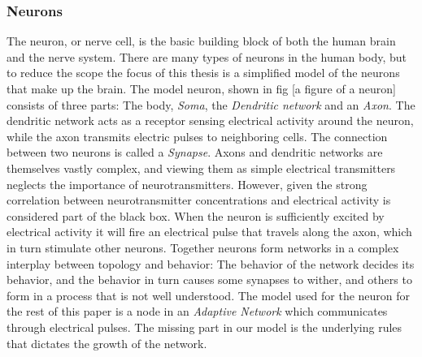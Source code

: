 \subsubsection{Neurons}
The neuron, or nerve cell, is the basic building block of both the human brain
and the nerve system.
There are many types of neurons in the human body, but to reduce the scope the
focus of this thesis is a simplified model of the neurons that make up the
brain.
The model neuron, shown in fig [a figure of a neuron] consists of three parts:
The body, \emph{Soma}, the \emph{Dendritic network} and an \emph{Axon}.
The dendritic network acts as a receptor sensing electrical activity around the
neuron, while the axon transmits electric pulses to neighboring cells.
The connection between two neurons is called a \emph{Synapse}.
Axons and dendritic networks are themselves vastly complex, and viewing them as
simple electrical transmitters neglects the importance of neurotransmitters.
However, given the strong correlation between neurotransmitter concentrations and
electrical activity is considered part of the black box.
When the neuron is sufficiently excited by electrical activity it will fire an
electrical pulse that travels along the axon, which in turn stimulate other
neurons.
Together neurons form networks in a complex interplay between topology and behavior:
The behavior of the network decides its behavior, and the behavior in turn
causes some synapses to wither, and others to form in a process that is not well
understood.
The model used for the neuron for the rest of this paper is a node in an
\emph{Adaptive Network} which communicates through electrical pulses.
The missing part in our model is the underlying rules that dictates the growth
of the network.

